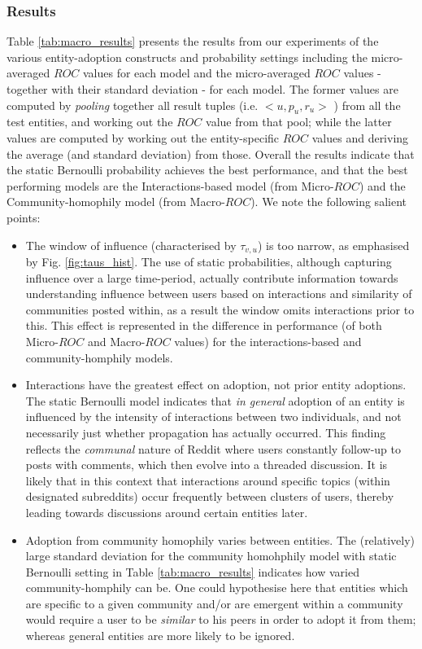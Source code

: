 \documentclass[review]{elsarticle}
\begin{document}
\subsubsection{Results}
Table \ref{tab:macro_results} presents the results from our experiments of the various entity-adoption constructs and probability settings including the micro-averaged $ROC$ values for each model and the micro-averaged $ROC$ values - together with their standard deviation - for each model.
The former values are computed by \emph{pooling} together all result tuples (i.e. $<u, p_u, r_u>$ ) from all the test entities, and working out the $ROC$ value from that pool; while the latter values are computed by working out the entity-specific $ROC$ values and deriving the average (and standard deviation) from those.
Overall the results indicate that the static Bernoulli probability achieves the best performance, and that the best performing models are the Interactions-based model (from Micro-$ROC$) and the Community-homophily model (from Macro-$ROC$).
We note the following salient points:

\begin{itemize}
	\item The window of influence (characterised by $\tau_{v,u}$) is too narrow, as emphasised by Fig. \ref{fig:taus_hist}. 
	The use of static probabilities, although capturing influence over a large time-period, actually contribute information towards understanding influence between users based on interactions and similarity of communities posted within, as a result the window omits interactions prior to this.
	This effect is represented in the difference in performance (of both Micro-$ROC$ and Macro-$ROC$ values) for the interactions-based and community-homphily models.
		
	\item Interactions have the greatest effect on adoption, not prior entity adoptions.
	The static Bernoulli model indicates that \emph{in general} adoption of an entity is influenced by the intensity of interactions between two individuals, and not necessarily just whether propagation has actually occurred.
	This finding reflects the \emph{communal} nature of Reddit where users constantly follow-up to posts with comments, which then evolve into a threaded discussion.
	It is likely that in this context that interactions around specific topics (within designated subreddits) occur frequently between clusters of users, thereby leading towards discussions around certain entities later.
	
	\item Adoption from community homophily varies between entities.
	The (relatively) large standard deviation for the community homohphily model with static Bernoulli setting in Table \ref{tab:macro_results} indicates how varied community-homphily can be.
	One could hypothesise here that entities which are specific to a given community and/or are emergent within a community would require a user to be \emph{similar} to his peers in order to adopt it from them; whereas general entities are more likely to be ignored.
	
\end{itemize}
\end{document}
